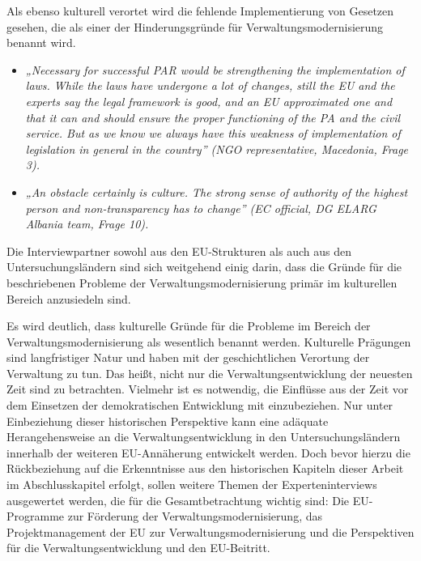 Als ebenso kulturell verortet wird die fehlende Implementierung von Gesetzen gesehen, die als einer der Hinderungsgründe für Verwaltungsmodernisierung benannt wird.
\begin{itemize}[label={}]
\item \textit{„Necessary for successful PAR would be strengthening the implementation of laws. While the laws have undergone a lot of changes, still the EU and the experts say the legal framework is good, and an EU approximated one and that it can and should ensure the proper functioning of the PA and the civil service. But as we know we always have this weakness of implementation of legislation in general in the country” (NGO representative, Macedonia, Frage 3).}
\item \textit{„An obstacle certainly is culture. The strong sense of authority of the highest person and non-transparency has to change” (EC official, DG ELARG Albania team, Frage 10).}
\end{itemize}
Die Interviewpartner sowohl aus den EU-Strukturen als auch aus den Untersuchungsländern sind sich weitgehend einig darin, dass die Gründe für die beschriebenen Probleme der Verwaltungsmodernisierung primär im kulturellen Bereich anzusiedeln sind.\par
Es wird deutlich, dass kulturelle Gründe für die Probleme im Bereich der Verwaltungsmodernisierung als wesentlich benannt werden. Kulturelle Prägungen sind langfristiger Natur und haben mit der geschichtlichen Verortung der Verwaltung zu tun. Das heißt, nicht nur die Verwaltungsentwicklung der neuesten Zeit sind zu betrachten. Vielmehr ist es notwendig, die Einflüsse aus der Zeit vor dem Einsetzen der demokratischen Entwicklung mit einzubeziehen. Nur unter Einbeziehung dieser historischen Perspektive kann eine adäquate Herangehensweise an die Verwaltungsentwicklung in den Untersuchungsländern innerhalb der weiteren EU-Annäherung entwickelt werden. Doch bevor hierzu die Rückbeziehung auf die Erkenntnisse aus den historischen Kapiteln dieser Arbeit im Abschlusskapitel erfolgt, sollen weitere Themen der Experteninterviews ausgewertet werden, die für die Gesamtbetrachtung wichtig sind: Die EU-Programme zur Förderung der Verwaltungsmodernisierung, das Projektmanagement der EU zur Verwaltungsmodernisierung und die Perspektiven für die Verwaltungsentwicklung und den EU-Beitritt.

